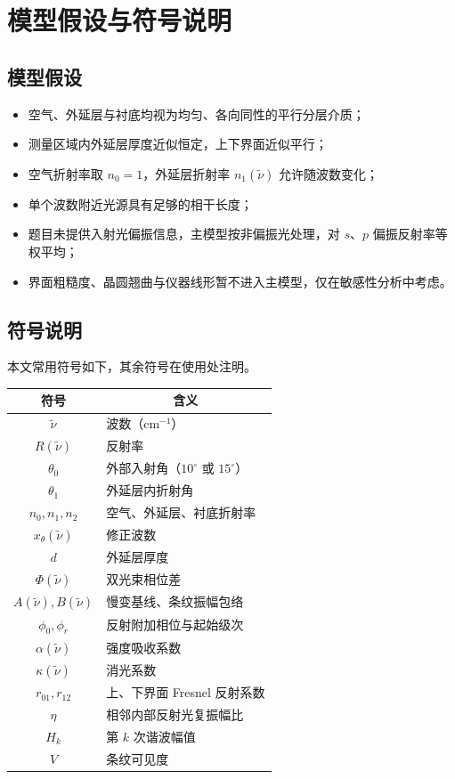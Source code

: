 \documentclass[withoutpreface,bwprint]{cumcmthesis}
\begin{document}
\section{模型假设与符号说明}
\subsection{模型假设}
\begin{itemize}
	\item[(1)] 空气、外延层与衬底均视为均匀、各向同性的平行分层介质；
	\item[(2)] 测量区域内外延层厚度近似恒定，上下界面近似平行；
	\item[(3)] 空气折射率取 $n_0=1$，外延层折射率 $n_1(\tilde\nu)$ 允许随波数变化；
	\item[(4)] 单个波数附近光源具有足够的相干长度；
	\item[(5)] 题目未提供入射光偏振信息，主模型按非偏振光处理，对 $s$、$p$ 偏振反射率等权平均；
	\item[(6)] 界面粗糙度、晶圆翘曲与仪器线形暂不进入主模型，仅在敏感性分析中考虑。
\end{itemize}

\subsection{符号说明}
本文常用符号如下，其余符号在使用处注明。
\begin{longtable}{cl}
	\toprule[1.5pt]
	符号 & \multicolumn{1}{c}{含义} \\
	\midrule[1pt]
	$\tilde\nu$ & 波数（$\mathrm{cm^{-1}}$）\\
	$R(\tilde\nu)$ & 反射率 \\
	$\theta_0$ & 外部入射角（$10^\circ$ 或 $15^\circ$）\\
	$\theta_1$ & 外延层内折射角 \\
	$n_0,n_1,n_2$ & 空气、外延层、衬底折射率 \\
	$x_\theta(\tilde\nu)$ & 修正波数 \\
	$d$ & 外延层厚度 \\
	$\Phi(\tilde\nu)$ & 双光束相位差 \\
	$A(\tilde\nu),B(\tilde\nu)$ & 慢变基线、条纹振幅包络 \\
	$\phi_0,\phi_r$ & 反射附加相位与起始级次 \\
	$\alpha(\tilde\nu)$ & 强度吸收系数 \\
	$\kappa(\tilde\nu)$ & 消光系数 \\
	$r_{01},r_{12}$ & 上、下界面 Fresnel 反射系数 \\
	$\eta$ & 相邻内部反射光复振幅比 \\
	$H_k$ & 第 $k$ 次谐波幅值 \\
	$V$ & 条纹可见度 \\
	\bottomrule[1.5pt]
\end{longtable}
\end{document}
